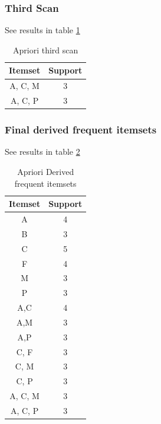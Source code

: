 \documentclass[11pt]{article}
\begin{document}
\subsubsection{Third Scan}
See results in table \ref{tab:3rd}
\begin{table}[]
    \centering
    \begin{tabular}{|c|c|} \hline
        Itemset & Support \\ \hline
        A, C, M & 3  \\ \hline
        A, C, P & 3  \\ \hline
    \end{tabular}
    \caption{Apriori third scan}
    \label{tab:3rd}
\end{table}
\subsubsection{Final derived frequent itemsets}
See results in table \ref{tab:final}
\begin{table}[]
    \centering
    \begin{tabular}{|c|c|} \hline
        Itemset & Support \\ \hline
        A & 4 \\ \hline
        B & 3 \\ \hline
        C & 5 \\ \hline
        F & 4 \\ \hline
        M & 3 \\ \hline
        P & 3 \\ \hline
        A,C & 4 \\ \hline
        A,M & 3 \\ \hline
        A,P & 3 \\ \hline
        C, F & 3 \\ \hline
        C, M & 3 \\ \hline
        C, P & 3 \\ \hline
        A, C, M & 3  \\ \hline
        A, C, P & 3  \\ \hline
    \end{tabular}
    \caption{Apriori Derived frequent itemsets}
    \label{tab:final}
\end{table}
\end{document}
